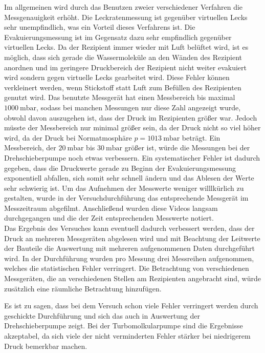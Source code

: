\noindent Im allgemeinen wird durch das Benutzen zweier verschiedener Verfahren die Messgenauigkeit erhöht. Die Leckratenmessung ist gegenüber virtuellen Lecks sehr unempfindlich, was 
ein Vorteil dieses Verfahrens ist. 
Die Evakuierungsmessung ist im Gegensatz dazu sehr empfindlich gegenüber virtuellen Lecks. Da der Rezipient immer wieder mit Luft belüftet wird, ist es möglich, dass sich gerade die Wassermoleküle 
an den Wänden des Rezipient anordnen und im geringere Druckbereich der Rezipient nicht weiter evakuiert wird sondern gegen virtuelle Lecks gearbeitet wird. 
Diese Fehler können verkleinert werden, wenn Stickstoff statt Luft zum Befüllen des Rezipienten genutzt wird. 
Das benutzte Messgerät hat einen Messbereich bis maximal $\SI{1000}{\milli\bar}$, sodass bei manchen Messungen nur diese Zahl angezeigt wurde, obwohl davon auszugehen ist, dass der Druck 
im Rezipienten größer war. Jedoch müsste der Messbereich nur minimal größer sein, da der Druck nicht so viel höher wird, da der Druck bei Normatmosphäre $p = \SI{1013}{\milli\bar}$ beträgt. 
Ein Messbereich, der $\SI{20}{\milli\bar}$ bis $\SI{30}{\milli\bar}$ größer ist, würde die Messungen bei der Drehschieberpumpe noch etwas verbessern. 
Ein systematischer Fehler ist dadurch gegeben, dass die Druckwerte gerade zu Beginn der Evakuierungsmessung exponentiell abfallen, sich somit sehr schnell ändern und das Ablesen der Werte 
sehr schwierig ist. Um das Aufnehmen der Messwerte weniger willlkürlich zu gestalten, wurde in der Versuchdurchführung das entsprechende Messgerät im Messzeitraum abgefilmt. Anschließend 
wurden diese Videos langsam durchgegangen und die der Zeit entsprechenden Messwerte notiert. \\
Das Ergebnis des Versuches kann eventuell dadurch verbessert werden, dass der Druck an mehreren Messgeräten abgelesen wird und mit Beachtung der Leitwerte der Bauteile die Auswertung mit 
mehreren aufgenommenen Daten durchgeführt wird. In der Durchführung wurden pro Messung drei Messreihen aufgenommen, welches die statistischen Fehler verringert. Die Betrachtung von 
verschiedenen Messgeräten, die an verschiedenen Stellen am Rezipienten angebracht sind, würde zusätzlich eine räumliche Betrachtung hinzufügen. 

\noindent Es ist zu sagen, dass bei dem Versuch schon viele Fehler verringert werden durch geschickte Durchführung und sich das auch in Auswertung der Drehschieberpumpe zeigt. Bei der 
Turbomolkularpumpe sind die Ergebnisse akzeptabel, da sich viele der nicht verminderten Fehler stärker bei niedrigerem Druck bemerkbar machen. 